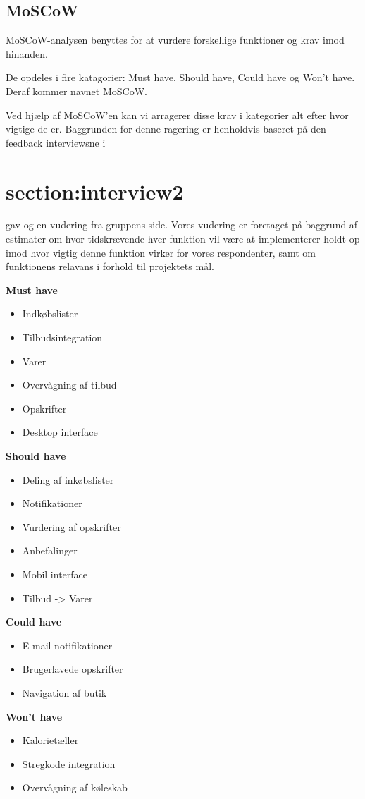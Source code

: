 \subsection{MoSCoW}
MoSCoW-analysen benyttes for at vurdere forskellige funktioner og krav imod hinanden.

De opdeles i fire katagorier: Must have, Should have, Could have og Won't have.
Deraf kommer navnet MoSCoW.

Ved hjælp af MoSCoW'en kan vi arragerer disse krav i kategorier alt efter hvor vigtige de er.
Baggrunden for denne ragering er henholdvis baseret på den feedback interviewsne i \section{section:interview2} gav og en vudering fra gruppens side.
Vores vudering er foretaget på baggrund af estimater om hvor tidskrævende hver funktion vil være at implementerer holdt op imod hvor vigtig denne funktion virker for vores respondenter, samt om funktionens relavans i forhold til projektets mål.


\noindent\parbox[t]{2.7in}{\raggedright
	\textbf{Must have}
	\begin{itemize}
			\item Indkøbslister
			\item Tilbudsintegration
			\item Varer
			\item Overvågning af tilbud
			\item Opskrifter
			\item Desktop interface
	\end{itemize}
}
\parbox[t]{2.7in}{\raggedright%
	\textbf{Should have}
	\begin{itemize}
		\item Deling af inkøbslister
		\item Notifikationer
		\item Vurdering af opskrifter
		\item Anbefalinger
		\item Mobil interface
		\item Tilbud -> Varer
	\end{itemize}
}

\noindent\parbox[t]{2.7in}{\raggedright
	\textbf{Could have}
	\begin{itemize}
			\item E-mail notifikationer
			\item Brugerlavede opskrifter
			\item Navigation af butik
	\end{itemize}
}
\parbox[t]{2.7in}{\raggedright%
	\textbf{Won't have}
	\begin{itemize}
		\item Kalorietæller
		\item Stregkode integration
		\item Overvågning af køleskab
	\end{itemize}
}
